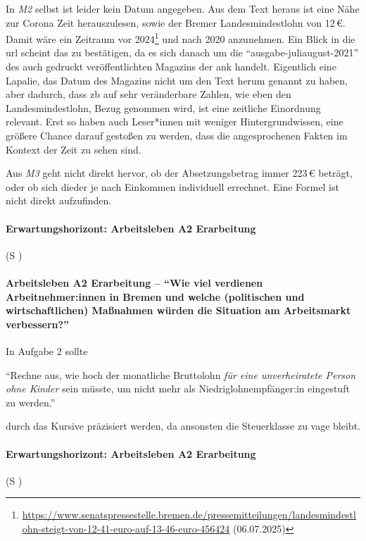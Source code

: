 In \emph{M2} selbst ist leider kein Datum angegeben. Aus dem Text heraus ist eine Nähe zur Corona Zeit herauszulesen, sowie der Bremer Landesmindestlohn von 12\,€. Damit wäre ein Zeitraum vor 2024\footnote{
    \url{https://www.senatspressestelle.bremen.de/pressemitteilungen/landesmindestlohn-steigt-von-12-41-euro-auf-13-46-euro-456424} (06.07.2025)
} und nach 2020 anzunehmen. Ein Blick in die \gls{url} scheint das zu bestätigen, da es sich danach um die \enquote{ausgabe-juliaugust-2021} des auch gedruckt veröffentlichten Magazins der \gls{ank} handelt. Eigentlich eine Lapalie, das Datum des Magazins nicht um den Text herum genannt zu haben, aber dadurch, dass \gls{zb} auf sehr veränderbare Zahlen, wie eben den Landesmindestlohn, Bezug genommen wird, ist eine zeitliche Einordnung relevant. Erst so haben auch Leser*innen mit weniger Hintergrundwissen, eine größere Chance darauf gestoßen zu werden, dass die angesprochenen Fakten im Kontext der Zeit zu sehen sind. 


Aus \emph{M3} geht nicht direkt hervor, ob der Absetzungsbetrag immer 223\,€ beträgt, oder ob sich dieder je nach Einkommen individuell errechnet. Eine Formel ist nicht direkt aufzufinden. 


\paragraph{Erwartungshorizont: Arbeitsleben A2 Erarbeitung} (\gls{S} \pageref{ARBEITSLEBEN-A2})

\paragraph{Arbeitsleben A2 Erarbeitung -- \enquote{Wie viel verdienen Arbeitnehmer:innen in Bremen und welche (politischen und wirtschaftlichen) Maßnahmen würden die Situation am Arbeitsmarkt verbessern?}}
\bigskip

In Aufgabe 2 sollte 

\enquote{Rechne aus, wie hoch der monatliche Bruttolohn \emph{für eine unverheiratete Person ohne Kinder} sein müsste, um nicht mehr als Niedriglohnempfänger:in eingestuft zu werden.} 

durch das Kursive präzisiert werden, da ansonsten die Steuerklasse zu vage bleibt. 






\paragraph{Erwartungshorizont: Arbeitsleben A2 Erarbeitung} (\gls{S} \pageref{ARBEITSLEBEN-A2})



